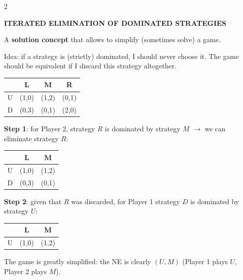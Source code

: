 \documentclass[a4paper,9pt]{extarticle}
\begin{document}
\begin{multicols}{2}
\begin{definition}

\textbf{ITERATED ELIMINATION OF DOMINATED STRATEGIES}

A \textbf{solution concept} that allows to simplify (sometimes solve) a game.

Idea: if a strategy is (strictly) dominated, I should never choose it. The game should be
equivalent if I discard this strategy altogether.

\end{definition}


\begin{example}

\begin{center}
\begin{tabular}{c|ccc}
 & L & M & R \\
\hline
U & (1,0) & (1,2) & (0,1) \\
D & (0,3) & (0,1) & (2,0) \\
\end{tabular}
\end{center}

\textbf{Step 1}: for Player 2, strategy $R$ is dominated by strategy $M$ $\rightarrow$ we
can eliminate strategy $R$:

\begin{center}
\begin{tabular}{c|cc}
 & L & M \\
\hline
U & (1,0) & (1,2) \\
D & (0,3) & (0,1) \\
\end{tabular}
\end{center}

\textbf{Step 2}: given that $R$ was discarded, for Player 1 strategy $D$ is dominated by
strategy $U$:

\begin{center}
\begin{tabular}{c|cc}
 & L & M \\
\hline
U & (1,0) & (1,2) \\
\end{tabular}
\end{center}

The game is greatly simplified: the NE is clearly $(U,M)$ (Player 1 plays $U$, Player 2
plays $M$).

\end{example}




\end{multicols}
\end{document}
